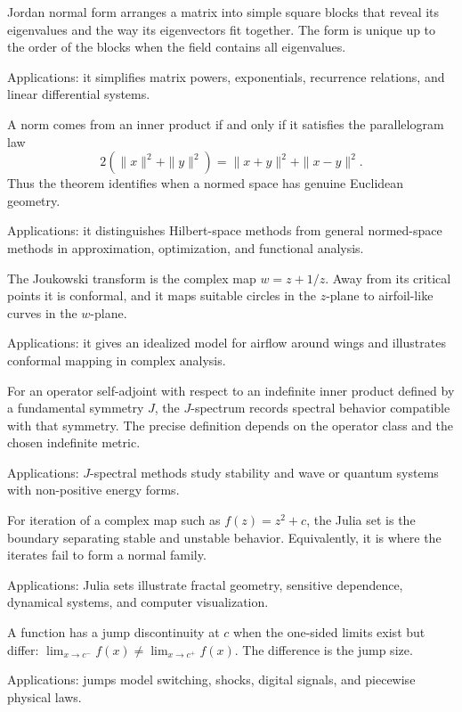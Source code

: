 Jordan normal form arranges a matrix into simple square blocks that reveal its eigenvalues and the way its eigenvectors fit together. The form is unique up to the order of the blocks when the field contains all eigenvalues. \par\noindent Applications: it simplifies matrix powers, exponentials, recurrence relations, and linear differential systems.

A norm comes from an inner product if and only if it satisfies the parallelogram law
\[
2(\|x\|^2+\|y\|^2)=\|x+y\|^2+\|x-y\|^2.
\]
Thus the theorem identifies when a normed space has genuine Euclidean geometry. \par\noindent Applications: it distinguishes Hilbert-space methods from general normed-space methods in approximation, optimization, and functional analysis.

The Joukowski transform is the complex map $w=z+1/z$. Away from its critical points it is conformal, and it maps suitable circles in the $z$-plane to airfoil-like curves in the $w$-plane. \par\noindent Applications: it gives an idealized model for airflow around wings and illustrates conformal mapping in complex analysis.

For an operator self-adjoint with respect to an indefinite inner product defined by a fundamental symmetry $J$, the $J$-spectrum records spectral behavior compatible with that symmetry. The precise definition depends on the operator class and the chosen indefinite metric. \par\noindent Applications: $J$-spectral methods study stability and wave or quantum systems with non-positive energy forms.

For iteration of a complex map such as $f(z)=z^2+c$, the Julia set is the boundary separating stable and unstable behavior. Equivalently, it is where the iterates fail to form a normal family. \par\noindent Applications: Julia sets illustrate fractal geometry, sensitive dependence, dynamical systems, and computer visualization.

A function has a jump discontinuity at $c$ when the one-sided limits exist but differ: $\lim_{x\to c^-}f(x)\ne\lim_{x\to c^+}f(x)$. The difference is the jump size. \par\noindent Applications: jumps model switching, shocks, digital signals, and piecewise physical laws.

